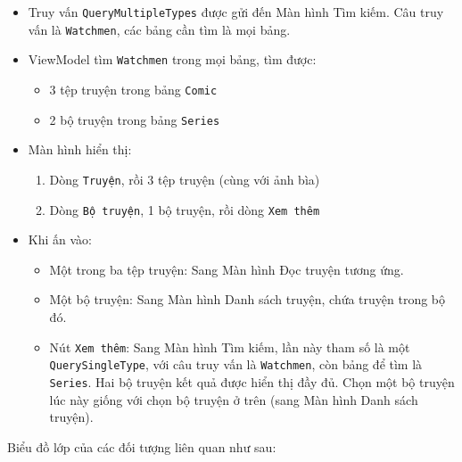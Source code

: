 \documentclass[../../../../thesis]{subfiles}
\begin{document}
\begin{itemize}
    \item
        Truy vấn \texttt{QueryMultipleTypes} được gửi đến Màn hình Tìm kiếm. Câu
        truy vấn là \texttt{Watchmen}, các bảng cần tìm là mọi bảng.
    \item
        ViewModel tìm \texttt{Watchmen} trong mọi bảng, tìm được:

        \begin{itemize}
            \item
              3 tệp truyện trong bảng \texttt{Comic}
            \item
                2 bộ truyện trong bảng \texttt{Series}
        \end{itemize}
    \item
        Màn hình hiển thị:

        \begin{enumerate}
            \item
                Dòng \texttt{Truyện}, rồi 3 tệp truyện (cùng với ảnh bìa)
            \item
                Dòng \texttt{Bộ\ truyện}, 1 bộ truyện, rồi dòng \texttt{Xem\
                thêm}
        \end{enumerate}
    \item
        Khi ấn vào:

        \begin{itemize}
            \item
                Một trong ba tệp truyện: Sang Màn hình Đọc truyện tương ứng.
            \item
                Một bộ truyện: Sang Màn hình Danh sách truyện, chứa truyện trong
                bộ đó.
            \item
                Nút \texttt{Xem\ thêm}: Sang Màn hình Tìm kiếm, lần này tham số
                là một \texttt{QuerySingleType}, với câu truy vấn là
                \texttt{Watchmen}, còn bảng để tìm là \texttt{Series}. Hai bộ
                truyện kết quả được hiển thị đầy đủ. Chọn một bộ truyện lúc này
                giống với chọn bộ truyện ở trên (sang Màn hình Danh sách
                truyện).
        \end{itemize}
\end{itemize}

Biểu đồ lớp của các đối tượng liên quan như sau:
\end{document}
